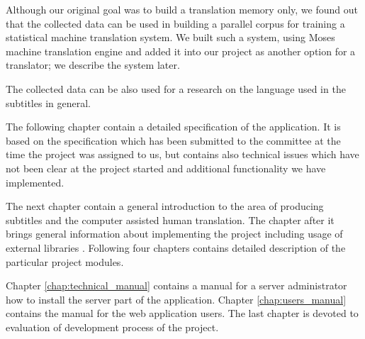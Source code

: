 Although our original goal was to build a translation memory only, we found out that the collected data can be used in building a parallel corpus for training a statistical machine translation system. We built such a system, using Moses machine translation engine and added it into our project as another option for a translator; we describe the system later.

The collected data can be also used for a research on the language used in the subtitles in general.

The following chapter contain a detailed specification of the application. It is based on the specification which has been submitted to the committee at the time the project was assigned to us, but contains also technical issues which have not been clear at the project started and additional functionality we have implemented. 

The next chapter contain a general introduction to the area of producing subtitles and the computer assisted human translation. The chapter after it brings general information about implementing the project including usage of external libraries . Following four chapters contains detailed description of the particular project modules.

Chapter \ref{chap:technical_manual} contains a manual for a server administrator how to install the server part of the application. Chapter \ref{chap:users_manual} contains the manual for the web application users. The last chapter is devoted to evaluation of development process of the project.